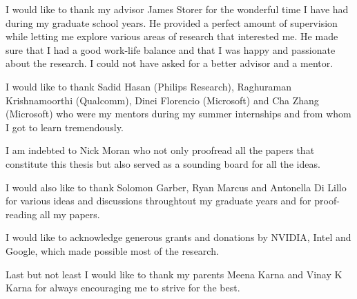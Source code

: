 I would like to thank my advisor James Storer for the wonderful time I have had during my graduate school years. He provided a perfect amount of supervision while letting me explore various areas of research that interested me.
He made sure that I had a good work-life balance and that I was happy and passionate about the research.
I could not have asked for a better advisor and a mentor.

I would like to thank Sadid Hasan (Philips Research), Raghuraman Krishnamoorthi (Qualcomm), Dinei Florencio (Microsoft) and Cha Zhang (Microsoft) who were my mentors during my summer internships and from whom I got to learn tremendously.  

I am indebted to Nick Moran who not only proofread all the papers that constitute this thesis but also served as a sounding board for all the ideas.

I would also like to thank Solomon Garber, Ryan Marcus and Antonella Di Lillo for various ideas and discussions throughtout my graduate years and for proof-reading all my papers.

I would like to acknowledge generous grants and donations by NVIDIA, Intel and Google, which made possible most of the research.

Last but not least I would like to thank my parents Meena Karna and Vinay K Karna for always encouraging me to strive for the best.
